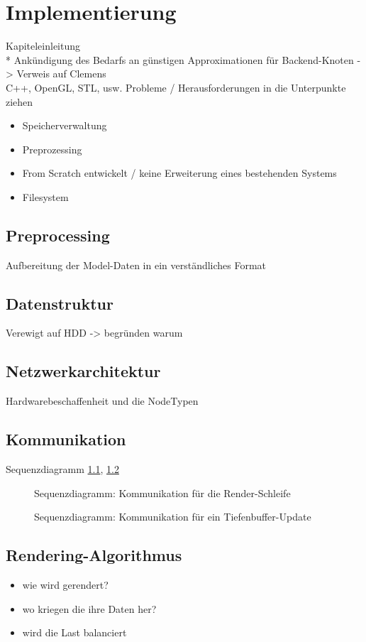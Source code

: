 
\chapter{Implementierung}
\label{chap:impl}
Kapiteleinleitung\\*
Ankündigung des Bedarfs an günstigen Approximationen für Backend-Knoten -> Verweis auf Clemens\\
C++, OpenGL, STL, usw.
Probleme / Herausforderungen in die Unterpunkte ziehen
\begin{itemize}
 \item Speicherverwaltung
 \item Preprozessing
 \item From Scratch entwickelt / keine Erweiterung eines bestehenden Systems
 \item Filesystem
\end{itemize}

\section{Preprocessing}
\label{sec:impl:preprocessing}
Aufbereitung der Model-Daten in ein verständliches Format

\section{Datenstruktur}
\label{sec:impl:datenstruktur}
Verewigt auf HDD -> begründen warum

\section{Netzwerkarchitektur}
\label{sec:impl:netzwerkarchitektur}
Hardwarebeschaffenheit und die NodeTypen

\section{Kommunikation}
\label{sec:impl:kommunikation}
Sequenzdiagramm \ref{fig:impl:seqdiagrender}, \ref{fig:impl:seqdiagdepth}

\begin{figure}

  \caption{Sequenzdiagramm: Kommunikation für die Render-Schleife}
  \label{fig:impl:seqdiagrender}
\end{figure}

\begin{figure}

  \caption{Sequenzdiagramm: Kommunikation für ein Tiefenbuffer-Update}
  \label{fig:impl:seqdiagdepth}
\end{figure}

\section{Rendering-Algorithmus}
\label{sec:impl:renderalgo}
\begin{itemize}
 \item wie wird gerendert?
 \item wo kriegen die ihre Daten her?
 \item wird die Last balanciert
\end{itemize}


%
%
